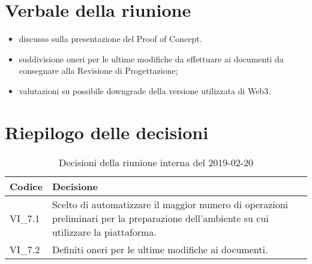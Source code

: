 \section{Verbale della riunione}
\begin{itemize}
	\item discusso sulla presentazione del Proof of Concept.
	\item suddivisione oneri per le ultime modifiche da effettuare ai documenti 
	da consegnare alla Revisione di Progettazione;
	\item valutazioni su possibile downgrade della versione utilizzata di Web3.
	
\end{itemize}

\hspace{3cm}

\section{Riepilogo delle decisioni}

	
	\begin{longtable}{ >{\centering}p{} >{}p{}}
		\caption{Decisioni della riunione interna del 2019-02-20}\\	
		\rowcolorhead
		\textbf{\color{white}Codice} 
		& \centering\textbf{\color{white}Decisione} 
		\tabularnewline 
		\endfirsthead
		VI\_7.1 & Scelto di automatizzare il maggior numero di operazioni 
		preliminari per la preparazione dell'ambiente su cui utilizzare la 
		piattaforma.
		\tabularnewline 
		VI\_7.2 & Definiti oneri per le ultime modifiche ai documenti.
		
		
		
	\end{longtable}
	




